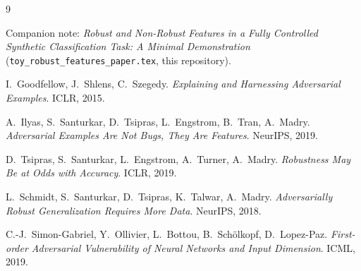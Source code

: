 \documentclass[11pt]{article}
\begin{document}
\begin{thebibliography}{9}

Companion note: \emph{Robust and Non-Robust Features in a Fully Controlled
Synthetic Classification Task: A Minimal Demonstration}
(\texttt{toy\_robust\_features\_paper.tex}, this repository).

I.~Goodfellow, J.~Shlens, C.~Szegedy.
\emph{Explaining and Harnessing Adversarial Examples}. ICLR, 2015.

A.~Ilyas, S.~Santurkar, D.~Tsipras, L.~Engstrom, B.~Tran, A.~Madry.
\emph{Adversarial Examples Are Not Bugs, They Are Features}. NeurIPS, 2019.

D.~Tsipras, S.~Santurkar, L.~Engstrom, A.~Turner, A.~Madry.
\emph{Robustness May Be at Odds with Accuracy}. ICLR, 2019.

L.~Schmidt, S.~Santurkar, D.~Tsipras, K.~Talwar, A.~Madry.
\emph{Adversarially Robust Generalization Requires More Data}. NeurIPS, 2018.

C.-J.~Simon-Gabriel, Y.~Ollivier, L.~Bottou, B.~Sch\"olkopf, D.~Lopez-Paz.
\emph{First-order Adversarial Vulnerability of Neural Networks and Input
Dimension}. ICML, 2019.

\end{thebibliography}
\end{document}
